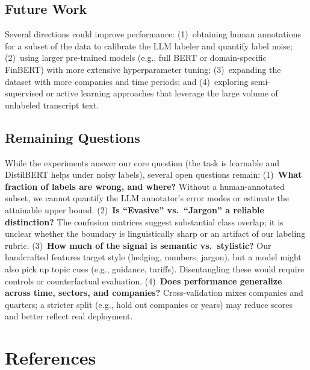 \documentclass[12pt]{article}
\begin{document}
\subsection{Future Work}

Several directions could improve performance: (1)~obtaining human
annotations for a subset of the data to calibrate the LLM labeler and
quantify label noise; (2)~using larger pre-trained models (e.g., full
BERT or domain-specific FinBERT) with more extensive hyperparameter
tuning; (3)~expanding the dataset with more companies and time periods;
and (4)~exploring semi-supervised or active learning approaches that
leverage the large volume of unlabeled transcript text.

\subsection{Remaining Questions}
While the experiments answer our core question (the task is learnable and
DistilBERT helps under noisy labels), several open questions remain:
(1)~\textbf{What fraction of labels are wrong, and where?} Without a
human-annotated subset, we cannot quantify the LLM annotator's error modes
or estimate the attainable upper bound.
(2)~\textbf{Is ``Evasive'' vs.\ ``Jargon'' a reliable distinction?} The confusion
matrices suggest substantial class overlap; it is unclear whether the boundary
is linguistically sharp or an artifact of our labeling rubric.
(3)~\textbf{How much of the signal is semantic vs.\ stylistic?} Our handcrafted
features target style (hedging, numbers, jargon), but a model might also pick up
topic cues (e.g., guidance, tariffs). Disentangling these would require controls
or counterfactual evaluation.
(4)~\textbf{Does performance generalize across time, sectors, and companies?}
Cross-validation mixes companies and quarters; a stricter split (e.g., hold out
companies or years) may reduce scores and better reflect real deployment.

\section*{References}
\end{document}
